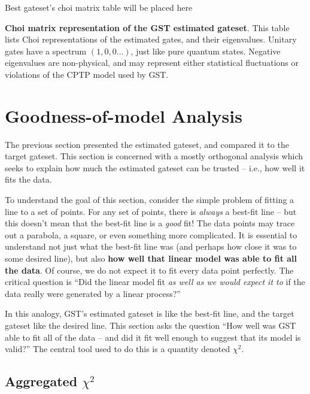 \documentclass{article}[11pt]
\newcommand{\putfield}[2]{#2}
\begin{document}
\begin{table}[h]
\begin{center}
\putfield{bestGatesetChoiTable}{Best gateset's choi matrix table will be placed here}
\caption{\textbf{Choi matrix representation of the GST estimated gateset}.  This table lists Choi representations of the estimated gates, and their eigenvalues.  Unitary gates have a spectrum $(1,0,0\ldots)$, just like pure quantum states.  Negative eigenvalues are non-physical, and may represent either statistical fluctuations or violations of the CPTP model used by GST.\label{bestGatesetChoiTable}}
\end{center}
\end{table}



\section{Goodness-of-model Analysis\label{secGoodness}}

The previous section presented the estimated gateset, and compared it to the target gateset.  This section is concerned with a mostly orthogonal analysis which seeks to explain how much the estimated gateset can be trusted -- i.e., how well it fits the data.

To understand the goal of this section, consider the simple problem of fitting a line to a set of points.  For any set of points, there is \emph{always} a best-fit line -- but this doesn't mean that the best-fit line is a \emph{good} fit!  The data points may trace out a parabola, a square, or even something more complicated.  It is essential to understand not just what the best-fit line was (and perhaps how close it was to some desired line), but also \textbf{how well that linear model was able to fit all the data}.  Of course, we do not expect it to fit every data point perfectly.  The critical question is ``Did the linear model fit \emph{as well as we would expect it to} if the data really were generated by a linear process?''

In this analogy, GST's estimated gateset is like the best-fit line, and the target gateset like the desired line.  This section asks the question ``How well was GST able to fit all of the data -- and did it fit well enough to suggest that its model is valid?'' The central tool used to do this is a quantity denoted $\chi^2$.  

\subsection{Aggregated $\chi^2$}
\end{document}
